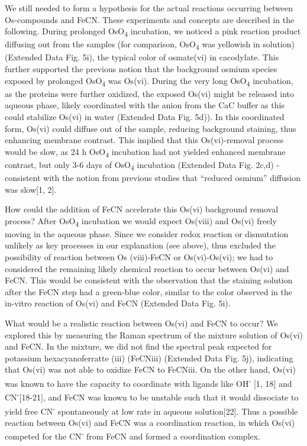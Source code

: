 \documentclass{article}
\begin{document}
We still needed to form a hypothesis for the actual reactions occurring between Os-compounds and FeCN. These experiments and concepts are described in the following. During prolonged OsO\textsubscript{4} incubation, we noticed a pink reaction product diffusing out from the samples (for comparison, OsO\textsubscript{4} was yellowish in solution) (Extended Data Fig. 5i), the typical color of osmate(vi) in cacodylate. This further supported the previous notion that the background osmium species exposed by prolonged OsO\textsubscript{4 }was Os(vi). During the very long OsO\textsubscript{4} incubation, as the proteins were further oxidized, the exposed Os(vi) might be released into aqueous phase, likely coordinated with the anion from the CaC buffer as this could stabilize Os(vi) in water (Extended Data Fig. 5d)). In this coordinated form, Os(vi) could diffuse out of the sample, reducing background staining, thus enhancing membrane contrast. This implied that this Os(vi)-removal process would be slow, as 24 h OsO\textsubscript{4} incubation had not yielded enhanced membrane contrast, but only 3-6 days of OsO\textsubscript{4} incubation (Extended Data Fig. 2c,d) -  consistent with the notion from previous studies that “reduced osmium” diffusion was slow[1, 2].  

How could the addition of FeCN accelerate this Os(vi) background removal process? After OsO\textsubscript{4} incubation we would expect Os(viii) and Os(vi) freely moving in the aqueous phase. Since we consider redox reaction or dismutation unlikely as key processes in our explanation (see above), thus excluded the possibility of reaction between Os (viii)-FeCN or Os(vi)-Os(vi); we had to considered the remaining likely chemical reaction to occur between Os(vi) and FeCN. This would be consistent with the observation that the staining solution after the FeCN step had a green-blue color, similar to the color observed in the in-vitro reaction of Os(vi) and FeCN (Extended Data Fig. 5i). 

What would be a realistic reaction between Os(vi) and FeCN to occur? We explored this by measuring the Raman spectrum of the mixture solution of Os(vi) and FeCN. In the mixture, we did not find the spectral peak expected for potassium hexacyanoferratte (iii) (FeCNiii) (Extended Data Fig. 5j), indicating that Os(vi) was not able to oxidize FeCN to FeCNiii. On the other hand, Os(vi) was known to have the capacity to coordinate with ligands like OH\textsuperscript{- }[1, 18] and CN\textsuperscript{-}[18-21], and FeCN was known to be unstable such that it would dissociate to yield free CN\textsuperscript{-} spontaneously at low rate in aqueous solution[22]. Thus a possible reaction between Os(vi) and FeCN was a coordination reaction, in which Os(vi) competed for the CN\textsuperscript{-} from FeCN and formed a coordination complex.  
\end{document}
